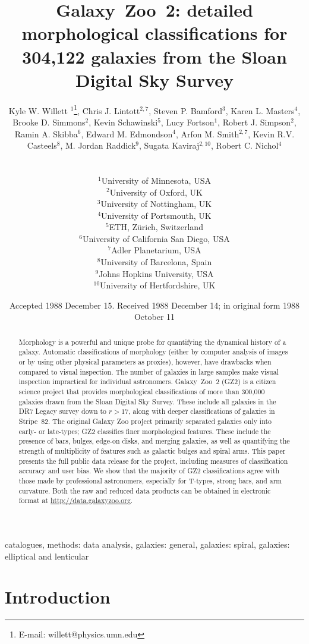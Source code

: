 \documentclass[useAMS,usenatbib]{mn2e}
\title[GZ2 data release]{Galaxy~Zoo~2: detailed morphological classifications for 304,122 galaxies from the Sloan Digital Sky Survey}
\author[Willett et al.]{
  \parbox[t]{16cm}{
  Kyle W. Willett $^{1}$\thanks{E-mail: willett@physics.umn.edu},
  Chris J. Lintott$^{2,7}$,
  Steven P. Bamford$^{3}$,
  Karen L. Masters$^{4}$,
  Brooke D. Simmons$^{2}$,
  Kevin Schawinski$^{5}$,
  Lucy Fortson$^{1}$,
  Robert J. Simpson$^{2}$,
  Ramin A. Skibba$^{6}$,
  Edward M. Edmondson$^{4}$,
  Arfon M. Smith$^{2,7}$,
  Kevin R.V. Casteels$^{8}$,
  M. Jordan Raddick$^{9}$,
  Sugata Kaviraj$^{2,10}$,
  Robert C. Nichol$^{4}$\\
  }\\
$^{1}$University of Minnesota, USA \\
$^{2}$University of Oxford, UK \\
$^{3}$University of Nottingham, UK \\
$^{4}$University of Portsmouth, UK \\
$^{5}$ETH, Z\"urich, Switzerland \\
$^{6}$University of California San Diego, USA \\
$^{7}$Adler Planetarium, USA \\
$^{8}$University of Barcelona, Spain \\
$^{9}$Johns Hopkins University, USA \\
$^{10}$University of Hertfordshire, UK \\
}
\begin{document}
\date{Accepted 1988 December 15. Received 1988 December 14; in original form 1988 October 11}

\pagerange{\pageref{firstpage}--\pageref{lastpage}} 

\maketitle

\label{firstpage}

\begin{abstract}
Morphology is a powerful and unique probe for quantifying the dynamical history of a galaxy. Automatic classifications of morphology (either by computer analysis of images or by using other physical parameters as proxies), however, have drawbacks when compared to visual inspection. The number of galaxies in large samples make visual inspection impractical for individual astronomers. Galaxy~Zoo~2 (GZ2) is a citizen science project that provides morphological classifications of more than 300,000 galaxies drawn from the Sloan Digital Sky Survey. These include all galaxies in the DR7 Legacy survey down to $r>17$, along with deeper classifications of galaxies in Stripe~82. The original Galaxy Zoo project primarily separated galaxies only into early- or late-types; GZ2 classifies finer morphological features. These include the presence of bars, bulges, edge-on disks, and merging galaxies, as well as quantifying the strength of multiplicity of features such as galactic bulges and spiral arms. This paper presents the full public data release for the project, including measures of classification accuracy and user bias. We show that the majority of GZ2 classifications agree with those made by professional astronomers, especially for T-types, strong bars, and arm curvature. Both the raw and reduced data products can be obtained in electronic format at \url{http://data.galaxyzoo.org}.
\end{abstract}

\begin{keywords}
catalogues, methods: data analysis, galaxies: general, galaxies: spiral, galaxies: elliptical and lenticular
\end{keywords}


\section{Introduction} \label{sec-intro}
\end{document}
